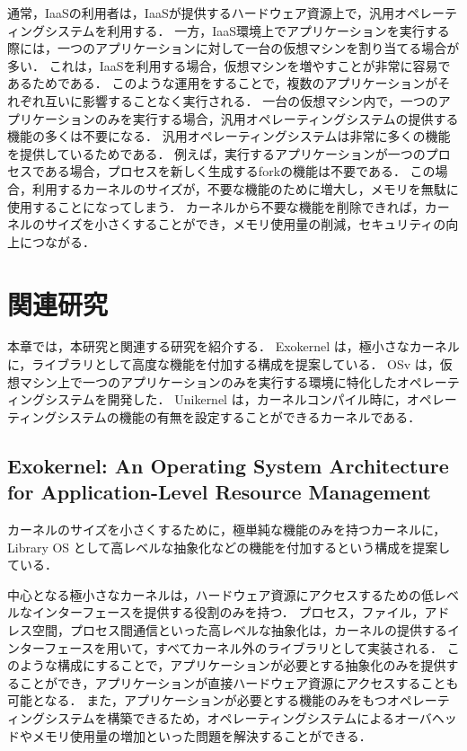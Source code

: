 \documentclass[graduation-thesis]{mlarticle}
\begin{document}
通常，IaaSの利用者は，IaaSが提供するハードウェア資源上で，汎用オペレーティングシステムを利用する．
一方，IaaS環境上でアプリケーションを実行する際には，一つのアプリケーションに対して一台の仮想マシンを割り当てる場合が多い．
これは，IaaSを利用する場合，仮想マシンを増やすことが非常に容易であるためである．
このような運用をすることで，複数のアプリケーションがそれぞれ互いに影響することなく実行される．
一台の仮想マシン内で，一つのアプリケーションのみを実行する場合，汎用オペレーティングシステムの提供する機能の多くは不要になる．
汎用オペレーティングシステムは非常に多くの機能を提供しているためである．
例えば，実行するアプリケーションが一つのプロセスである場合，プロセスを新しく生成するforkの機能は不要である．
この場合，利用するカーネルのサイズが，不要な機能のために増大し，メモリを無駄に使用することになってしまう．
カーネルから不要な機能を削除できれば，カーネルのサイズを小さくすることができ，メモリ使用量の削減，セキュリティの向上につながる．

\clearpage
\section {関連研究}
\label{relative}

本章では，本研究と関連する研究を紹介する．
Exokernel は，極小さなカーネルに，ライブラリとして高度な機能を付加する構成を提案している．
OSv は，仮想マシン上で一つのアプリケーションのみを実行する環境に特化したオペレーティングシステムを開発した．
Unikernel は，カーネルコンパイル時に，オペレーティングシステムの機能の有無を設定することができるカーネルである．

\subsection {Exokernel: An Operating System Architecture for Application-Level Resource Management}
\label{relarive:exokernel}
カーネルのサイズを小さくするために，極単純な機能のみを持つカーネルに，Library OS として高レベルな抽象化などの機能を付加するという構成を提案している．

中心となる極小さなカーネルは，ハードウェア資源にアクセスするための低レベルなインターフェースを提供する役割のみを持つ．
プロセス，ファイル，アドレス空間，プロセス間通信といった高レベルな抽象化は，カーネルの提供するインターフェースを用いて，すべてカーネル外のライブラリとして実装される．
このような構成にすることで，アプリケーションが必要とする抽象化のみを提供することができ，アプリケーションが直接ハードウェア資源にアクセスすることも可能となる．
また，アプリケーションが必要とする機能のみをもつオペレーティングシステムを構築できるため，オペレーティングシステムによるオーバヘッドやメモリ使用量の増加といった問題を解決することができる．
\end{document}

